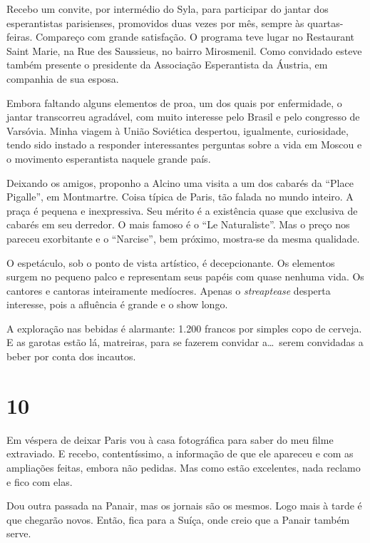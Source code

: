 Recebo um convite, por intermédio do Syla, para participar do jantar dos esperantistas parisienses, promovidos duas vezes por mês, sempre às quartas-feiras. Compareço com grande satisfação. O programa teve lugar no Restaurant Saint Marie, na Rue des Saussieus, no bairro Mirosmenil. Como convidado esteve também presente o presidente da Associação Esperantista da Áustria, em companhia de sua esposa.

Embora faltando alguns elementos de proa, um dos quais por enfermidade, o jantar transcorreu agradável, com muito interesse pelo Brasil e pelo congresso de Varsóvia. Minha viagem à União Soviética despertou, igualmente, curiosidade, tendo sido instado a responder interessantes perguntas sobre a vida em Moscou e o movimento esperantista naquele grande país.

Deixando os amigos, proponho a Alcino uma visita a um dos cabarés da ``Place Pigalle'', em Montmartre. Coisa típica de Paris, tão falada no mundo inteiro. A praça é pequena e inexpressiva. Seu mérito é a existência quase que exclusiva de cabarés em seu derredor. O mais famoso é o ``Le Naturaliste''. Mas o preço nos pareceu exorbitante e o ``Narcise'', bem próximo, mostra-se da mesma qualidade.

O espetáculo, sob o ponto de vista artístico, é decepcionante. Os elementos surgem no pequeno palco e representam seus papéis com quase nenhuma vida. Os cantores e cantoras inteiramente medíocres. Apenas o \textit{streaptease} desperta interesse, pois a afluência é grande e o show longo.

A exploração nas bebidas é alarmante: 1.200 francos por simples copo de cerveja. E as garotas estão lá, matreiras, para se fazerem convidar a\ldots\ serem convidadas a beber por conta dos incautos.

\section*{10 \adfflatleafright {}}
Em véspera de deixar Paris vou à casa fotográfica para saber do meu filme extraviado. E recebo, contentíssimo, a informação de que ele apareceu e com as ampliações feitas, embora não pedidas. Mas como estão excelentes, nada reclamo e fico com elas.

Dou outra passada na Panair, mas os jornais são os mesmos. Logo mais à tarde é que chegarão novos. Então, fica para a Suíça, onde creio que a Panair também serve.

